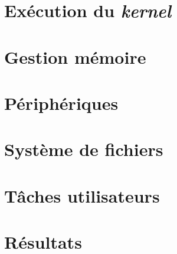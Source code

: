 \documentclass[a4paper, 12pt]{article}
\begin{document}

\newpage
\section{Exécution du \textit{kernel}}



\newpage
\section{Gestion mémoire}



\newpage
\section{Périphériques}



\newpage
\section{Système de fichiers}



\newpage
\section{Tâches utilisateurs}



\newpage
\section{Résultats}

\end{document}
